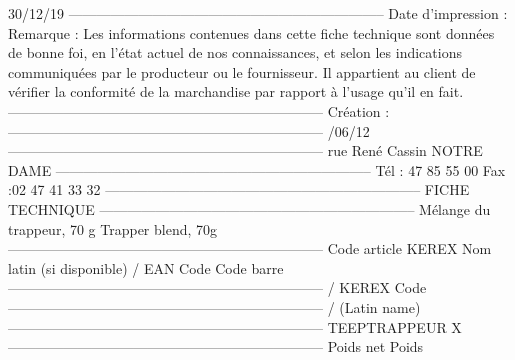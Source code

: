 30/12/19 \newline -------------------------------------------------------------------- \newline Date d'impression :  \newline Remarque :  \newline Les informations contenues dans cette fiche technique sont données de bonne foi, en l’état actuel de nos connaissances, et selon  \newline les indications communiquées par le producteur ou le fournisseur. Il appartient au client de vérifier la conformité de la marchandise  \newline par rapport à l’usage qu’il en fait. \newline -------------------------------------------------------------------- \newline Création :  \newline -------------------------------------------------------------------- /06/12 \newline --------------------------------------------------------------------  rue René Cassin  NOTRE DAME \newline -------------------------------------------------------------------- \newline Tél :  47 85 55 00 \newline Fax :02 47 41 33 32 \newline -------------------------------------------------------------------- \newline FICHE TECHNIQUE \newline -------------------------------------------------------------------- \newline Mélange du trappeur, 70 g \newline Trapper blend, 70g \newline -------------------------------------------------------------------- \newline Code article KEREX \newline Nom latin (si disponible) \newline / EAN Code \newline Code barre  \newline -------------------------------------------------------------------- \newline / KEREX Code \newline -------------------------------------------------------------------- \newline / (Latin name) \newline -------------------------------------------------------------------- \newline TEEPTRAPPEUR \newline X  \newline -------------------------------------------------------------------- \newline Poids net \newline Poids 